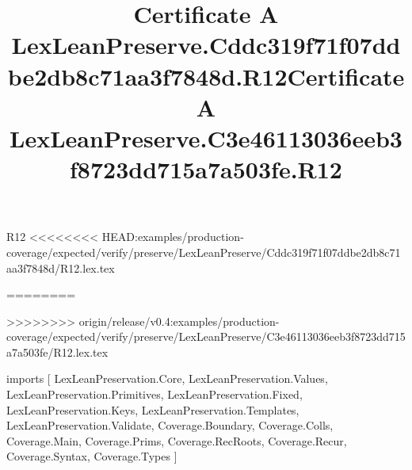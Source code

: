 \begin{lexlean}{R12}
<<<<<<<< HEAD:examples/production-coverage/expected/verify/preserve/LexLeanPreserve/Cddc319f71f07ddbe2db8c71aa3f7848d/R12.lex.tex
\title{Certificate A LexLeanPreserve.Cddc319f71f07ddbe2db8c71aa3f7848d.R12}
========
\title{Certificate A LexLeanPreserve.C3e46113036eeb3f8723dd715a7a503fe.R12}
>>>>>>>> origin/release/v0.4:examples/production-coverage/expected/verify/preserve/LexLeanPreserve/C3e46113036eeb3f8723dd715a7a503fe/R12.lex.tex
\begin{coremodule}
imports [
  LexLeanPreservation.Core,
  LexLeanPreservation.Values,
  LexLeanPreservation.Primitives,
  LexLeanPreservation.Fixed,
  LexLeanPreservation.Keys,
  LexLeanPreservation.Templates,
  LexLeanPreservation.Validate,
  Coverage.Boundary,
  Coverage.Colls,
  Coverage.Main,
  Coverage.Prims,
  Coverage.RecRoots,
  Coverage.Recur,
  Coverage.Syntax,
  Coverage.Types
]


\end{coremodule}
\end{lexlean}
